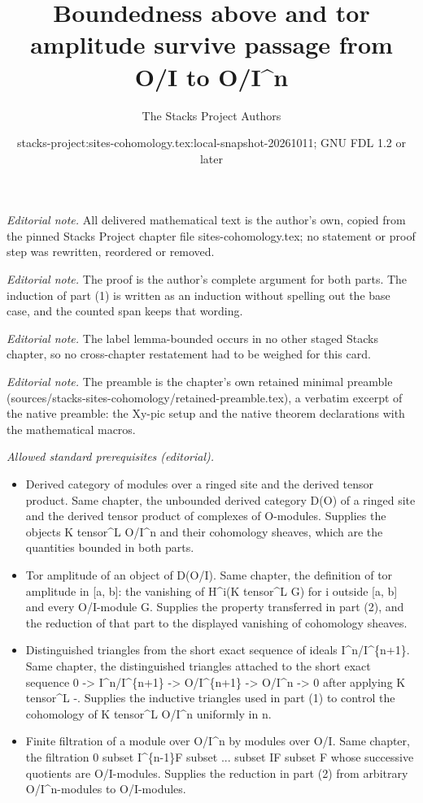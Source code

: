 \documentclass[10pt,a4paper]{amsart}
\title{Boundedness above and tor amplitude survive passage from O/I to O/I\textasciicircum{}n}
\author{The Stacks Project Authors}
\date{stacks-project:sites-cohomology.tex:local-snapshot-20261011; GNU FDL 1.2 or later}
\theoremstyle{plain}
\theoremstyle{definition}
\theoremstyle{remark}
\numberwithin{equation}{subsection}
\begin{document}
\maketitle
\noindent\textit{Editorial note.} All delivered mathematical text is the author's own, copied from the pinned Stacks Project chapter file sites-cohomology.tex; no statement or proof step was rewritten, reordered or removed.\par\medskip
\noindent\textit{Editorial note.} The proof is the author's complete argument for both parts. The induction of part (1) is written as an induction without spelling out the base case, and the counted span keeps that wording.\par\medskip
\noindent\textit{Editorial note.} The label lemma-bounded occurs in no other staged Stacks chapter, so no cross-chapter restatement had to be weighed for this card.\par\medskip
\noindent\textit{Editorial note.} The preamble is the chapter's own retained minimal preamble (sources/stacks-sites-cohomology/retained-preamble.tex), a verbatim excerpt of the native preamble: the Xy-pic setup and the native theorem declarations with the mathematical macros.\par\medskip
\noindent\textit{Allowed standard prerequisites (editorial).}\begin{itemize}
\item Derived category of modules over a ringed site and the derived tensor product. Same chapter, the unbounded derived category D(O) of a ringed site and the derived tensor product of complexes of O-modules. Supplies the objects K tensor\textasciicircum{}L O/I\textasciicircum{}n and their cohomology sheaves, which are the quantities bounded in both parts.
\item Tor amplitude of an object of D(O/I). Same chapter, the definition of tor amplitude in [a, b]: the vanishing of H\textasciicircum{}i(K tensor\textasciicircum{}L G) for i outside [a, b] and every O/I-module G. Supplies the property transferred in part (2), and the reduction of that part to the displayed vanishing of cohomology sheaves.
\item Distinguished triangles from the short exact sequence of ideals I\textasciicircum{}n/I\textasciicircum{}\{n+1\}. Same chapter, the distinguished triangles attached to the short exact sequence 0 -> I\textasciicircum{}n/I\textasciicircum{}\{n+1\} -> O/I\textasciicircum{}\{n+1\} -> O/I\textasciicircum{}n -> 0 after applying K tensor\textasciicircum{}L -. Supplies the inductive triangles used in part (1) to control the cohomology of K tensor\textasciicircum{}L O/I\textasciicircum{}n uniformly in n.
\item Finite filtration of a module over O/I\textasciicircum{}n by modules over O/I. Same chapter, the filtration 0 subset I\textasciicircum{}\{n-1\}F subset ... subset IF subset F whose successive quotients are O/I-modules. Supplies the reduction in part (2) from arbitrary O/I\textasciicircum{}n-modules to O/I-modules.
\end{itemize}\medskip
\end{document}
